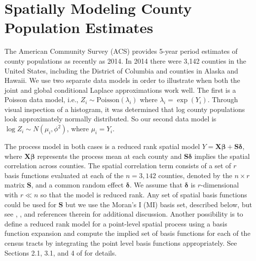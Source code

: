 \documentclass[12pt]{article}
\begin{document}
\section{Spatially Modeling County Population Estimates}\label{sec:pop}
The American Community Survey (ACS) provides 5-year period estimates of county populations as recently as 2014. In 2014 there were 3,142 counties in the United States, including the District of Columbia and counties in Alaska and Hawaii.  We use two separate data models in order to illustrate when both the joint and global conditional Laplace approximations work well. The first is a Poisson data model, i.e., $Z_i \sim \mathrm{Poisson}(\lambda_i)$ where $\lambda_i = \exp(Y_i)$. Through visual inspection of a histogram, it was determined that log county populations look approximately normally distributed. So our second data model is $\log Z_i \sim N(\mu_i, \phi^2)$, where $\mu_i = Y_i$. 

The process model in both cases is a reduced rank spatial model $Y = \bm{X}\bm{\beta} + \bm{S}\bm{\delta}$, where $\bm{X}\bm{\beta}$ represents the process mean at each county and $\bm{S}\bm{\delta}$ implies the spatial correlation across counties. The spatial correlation term consists of a set of $r$ basis functions evaluated at each of the $n=3,142$ counties, denoted by the $n\times r$ matrix $\bm{S}$, and a common random effect $\bm{\delta}$. We assume that $\bm{\delta}$ is $r$-dimensional with $r \ll n$ so that the model is reduced rank. Any set of spatial basis functions could be used for $\bm{S}$ but we use the Moran's I (MI) basis set, described below, but see \citet{hughes2013dimension}, \citet{porter2015bayesian}, \citet{bradley2015multivariate} and references therein for additional discussion. Another possibility is to define a reduced rank model for a point-level spatial process using a basis function expansion and compute the implied set of basis functions for each of the census tracts by integrating the point level basis functions appropriately. See Sections 2.1, 3.1, and 4 of \citet{bradley2016regionalization} for details.
\end{document}
